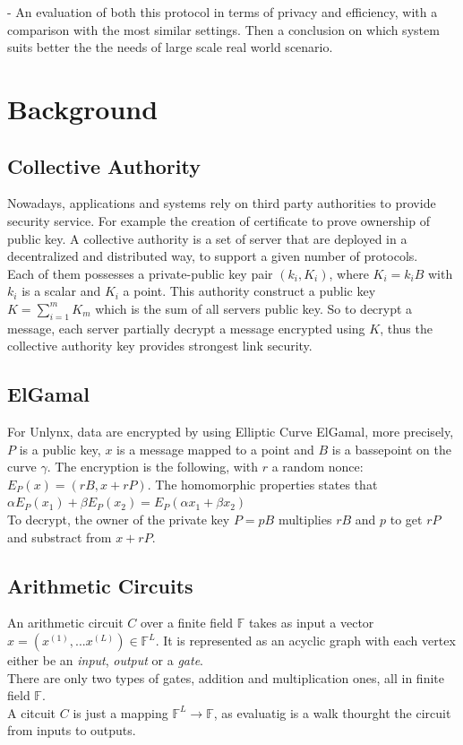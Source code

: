 \documentclass{article}
\begin{document}
- An evaluation of both this protocol in terms of privacy and efficiency, with a comparison with the most similar settings. Then a conclusion on which system suits better the the needs of large scale real world scenario.

\section*{Background}
\subsection*{Collective Authority}
Nowadays, applications and systems rely on third party authorities to provide security service. For example the creation of certificate to prove ownership of public key. A collective authority is a set of server that are deployed in a decentralized and distributed way, to support a given number of protocols.\\
Each of them possesses a private-public key pair $(k_i,K_i)$, where $K_i = k_i B$ with $k_i$ is a scalar and $K_i$ a point. This authority construct a public key $K = \sum_{i=1}^{m}{K_m}$ which is the sum of all servers public key. So to decrypt a message, each server partially decrypt a message encrypted using $K$, thus the collective authority key provides strongest link security.

\subsection*{ElGamal}
For Unlynx, data are encrypted by using Elliptic Curve ElGamal, more precisely, $P$ is a public key, $x$ is a message mapped to a point and $B$ is a bassepoint on the curve $\gamma$. The encryption is the following, with $r$ a random nonce:\\
$E_P(x) = (rB,x+rP)$. The homomorphic properties states that $\alpha E_P(x_1) + \beta E_P(x_2) = E_P(\alpha x_1+ \beta x_2)$\\
To decrypt, the owner of the private key $P = pB$ multiplies $rB$ and $p$ to get $rP$ and substract from $x + rP$.\\

\subsection*{Arithmetic Circuits}
An arithmetic circuit $C$ over a finite field $\mathbb{F}$ takes as input a vector $x = (x^{(1)},...x^{(L)}) \in \mathbb{F}^L $. It is represented as an acyclic graph with each vertex either be an \textit{input}, \textit{output} or a \textit{gate}.\\
There are only two types of gates, addition and multiplication ones, all in finite field $\mathbb{F}$.\\
A citcuit $C$ is just a mapping $\mathbb{F}^L \rightarrow \mathbb{F}$, as evaluatig is a walk thourght the circuit from inputs to outputs.
\end{document}
